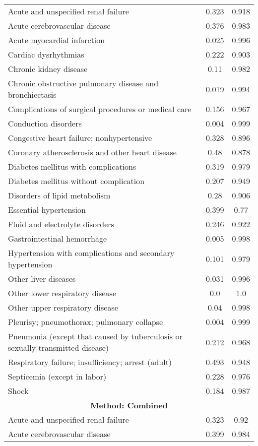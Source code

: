 \documentclass{article}
\begin{document}
\begin{longtable}{lcc}
\midrule
Acute and unspecified renal failure & 0.323 & 0.918 \\
Acute cerebrovascular disease & 0.376 & 0.983 \\
Acute myocardial infarction & 0.025 & 0.996 \\
Cardiac dysrhythmias & 0.222 & 0.903 \\
Chronic kidney disease & 0.11 & 0.982 \\
Chronic obstructive pulmonary disease and bronchiectasis & 0.019 & 0.994 \\
Complications of surgical procedures or medical care & 0.156 & 0.967 \\
Conduction disorders & 0.004 & 0.999 \\
Congestive heart failure; nonhypertensive & 0.328 & 0.896 \\
Coronary atherosclerosis and other heart disease & 0.48 & 0.878 \\
Diabetes mellitus with complications & 0.319 & 0.979 \\
Diabetes mellitus without complication & 0.207 & 0.949 \\
Disorders of lipid metabolism & 0.28 & 0.906 \\
Essential hypertension & 0.399 & 0.77 \\
Fluid and electrolyte disorders & 0.246 & 0.922 \\
Gastrointestinal hemorrhage & 0.005 & 0.998 \\
Hypertension with complications and secondary hypertension & 0.101 & 0.979 \\
Other liver diseases & 0.031 & 0.996 \\
Other lower respiratory disease & 0.0 & 1.0 \\
Other upper respiratory disease & 0.04 & 0.998 \\
Pleurisy; pneumothorax; pulmonary collapse & 0.004 & 0.999 \\
Pneumonia (except that caused by tuberculosis or sexually transmitted disease) & 0.212 & 0.968 \\
Respiratory failure; insufficiency; arrest (adult) & 0.493 & 0.948 \\
Septicemia (except in labor) & 0.228 & 0.976 \\
Shock & 0.184 & 0.987 \\
\midrule
\multicolumn{3}{c}{\textbf{Method: Combined}} \\
\midrule
Acute and unspecified renal failure & 0.323 & 0.92 \\
Acute cerebrovascular disease & 0.399 & 0.984 \\

\end{longtable}
\end{document}
